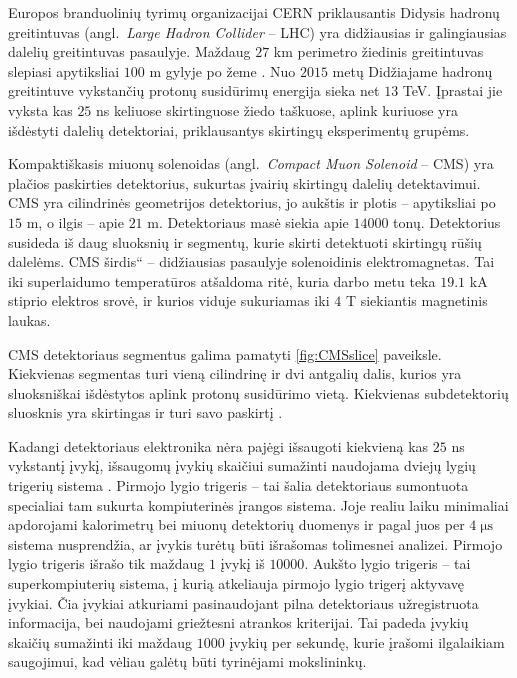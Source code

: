 \documentclass[a4paper, 12pt]{article}
\newcommand{\ltq}[1]{{\quotedblbase{}#1\textquotedblleft{}}}
\newlength\q
\begin{document}
Europos branduolinių tyrimų organizacijai CERN priklausantis Didysis hadronų greitintuvas
(angl.\ \textit{Large Hadron Collider} -- LHC) yra didžiausias ir galingiausias dalelių greitintuvas pasaulyje.
Maždaug $27$ km perimetro žiedinis greitintuvas slepiasi apytiksliai $100$ m gylyje po žeme \cite{LHC}.
Nuo $2015$ metų Didžiajame hadronų greitintuve vykstančių protonų susidūrimų energija sieka net $13$ TeV.
Įprastai jie vyksta kas $25$ ns keliuose skirtinguose žiedo taškuose, aplink kuriuose yra išdėstyti dalelių
detektoriai, priklausantys skirtingų eksperimentų grupėms.

Kompaktiškasis miuonų solenoidas (angl.\ \textit{Compact Muon Solenoid} -- CMS) yra plačios paskirties
detektorius, sukurtas įvairių skirtingų dalelių detektavimui.
CMS yra cilindrinės geometrijos detektorius, jo aukštis ir plotis -- apytiksliai po $15$ m, o ilgis --
apie $21$ m.
Detektoriaus masė siekia apie $14000$ tonų.
Detektorius susideda iš daug sluoksnių ir segmentų, kurie skirti detektuoti skirtingų rūšių dalelėms.
CMS \ltq{širdis} -- didžiausias pasaulyje solenoidinis elektromagnetas.
Tai iki superlaidumo temperatūros atšaldoma ritė, kuria darbo metu teka $19.1$ kA stiprio elektros srovė,
ir kurios viduje sukuriamas iki $4$ T siekiantis magnetinis laukas.

CMS detektoriaus segmentus galima pamatyti \ref{fig:CMSslice} paveiksle.
Kiekvienas segmentas turi vieną cilindrinę ir dvi antgalių dalis, kurios yra sluoksniškai išdėstytos
aplink protonų susidūrimo vietą.
Kiekvienas subdetektorių sluosknis yra skirtingas ir turi savo paskirtį \cite{CMSexperiment}.

Kadangi detektoriaus elektronika nėra pajėgi išsaugoti kiekvieną kas $25$ ns vykstantį įvykį, išsaugomų
įvykių skaičiui sumažinti naudojama dviejų lygių trigerių sistema \cite{CMStrig}.
Pirmojo lygio trigeris -- tai šalia detektoriaus sumontuota specialiai tam sukurta kompiuterinės
įrangos sistema.
Joje realiu laiku minimaliai apdorojami kalorimetrų bei miuonų detektorių duomenys ir pagal juos per
$4 \; \mathrm{\mu s}$ sistema nusprendžia, ar įvykis turėtų būti išrašomas tolimesnei analizei. 
Pirmojo lygio trigeris išrašo tik maždaug $1$ įvykį iš $10000$.
Aukšto lygio trigeris -- tai superkompiuterių sistema, į kurią atkeliauja pirmojo lygio trigerį
aktyvavę įvykiai.
Čia įvykiai atkuriami pasinaudojant pilna detektoriaus užregistruota informacija, bei naudojami
griežtesni atrankos kriterijai.
Tai padeda įvykių skaičių sumažinti iki maždaug $1000$ įvykių per sekundę, kurie įrašomi ilgalaikiam saugojimui,
kad vėliau galėtų būti tyrinėjami mokslininkų.
\end{document}
